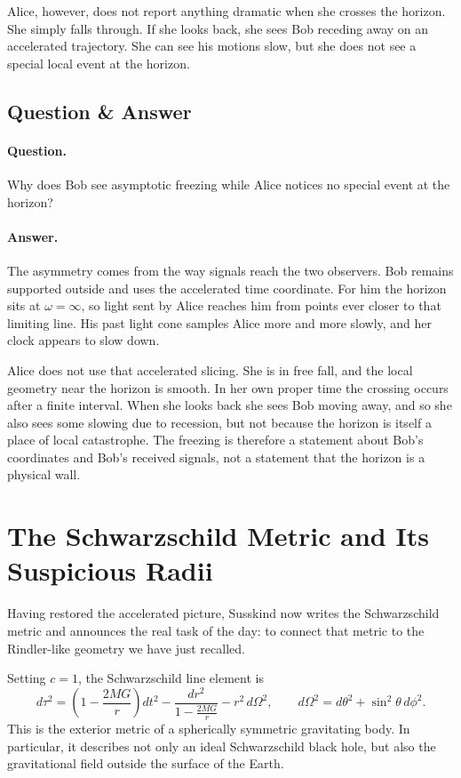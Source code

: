 Alice, however, does not report anything dramatic when she crosses the horizon. She simply falls through. If she looks back, she sees Bob receding away on an accelerated trajectory. She can see his motions slow, but she does not see a special local event at the horizon.

\subsection{Question \& Answer}

\paragraph{Question.} Why does Bob see asymptotic freezing while Alice notices no special event at the horizon?

\paragraph{Answer.} The asymmetry comes from the way signals reach the two observers. Bob remains supported outside and uses the accelerated time coordinate. For him the horizon sits at \(\omega=\infty\), so light sent by Alice reaches him from points ever closer to that limiting line. His past light cone samples Alice more and more slowly, and her clock appears to slow down.

Alice does not use that accelerated slicing. She is in free fall, and the local geometry near the horizon is smooth. In her own proper time the crossing occurs after a finite interval. When she looks back she sees Bob moving away, and so she also sees some slowing due to recession, but not because the horizon is itself a place of local catastrophe. The freezing is therefore a statement about Bob's coordinates and Bob's received signals, not a statement that the horizon is a physical wall.

\section{The Schwarzschild Metric and Its Suspicious Radii}

Having restored the accelerated picture, Susskind now writes the Schwarzschild metric and announces the real task of the day: to connect that metric to the Rindler-like geometry we have just recalled.

Setting \(c=1\), the Schwarzschild line element is
\begin{equation}
d\tau^2
=
\left(1-\frac{2MG}{r}\right)dt^2
-
\frac{dr^2}{1-\frac{2MG}{r}}
-
r^2\,d\Omega^2,
\qquad
d\Omega^2 = d\theta^2 + \sin^2\theta\,d\phi^2.
\end{equation}
This is the exterior metric of a spherically symmetric gravitating body. In particular, it describes not only an ideal Schwarzschild black hole, but also the gravitational field outside the surface of the Earth.

